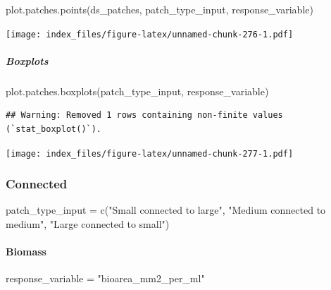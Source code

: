 \documentclass[
]{article}
\newenvironment{Shaded}{\begin{snugshade}}{\end{snugshade}}
\newcommand{\FunctionTok}[1]{\textcolor[rgb]{0.00,0.00,0.00}{#1}}
\newcommand{\NormalTok}[1]{#1}
\newcommand{\OtherTok}[1]{\textcolor[rgb]{0.56,0.35,0.01}{#1}}
\newcommand{\StringTok}[1]{\textcolor[rgb]{0.31,0.60,0.02}{#1}}
\begin{document}
\begin{Shaded}
\begin{Highlighting}[]
\FunctionTok{plot.patches.points}\NormalTok{(ds\_patches, patch\_type\_input,}
\NormalTok{                    response\_variable)}
\end{Highlighting}
\end{Shaded}

\texttt{[image: index\_files/figure-latex/unnamed-chunk-276-1.pdf]}

\hypertarget{boxplots-13}{%
\subparagraph{Boxplots}\label{boxplots-13}}

\begin{Shaded}
\begin{Highlighting}[]
\FunctionTok{plot.patches.boxplots}\NormalTok{(patch\_type\_input,}
\NormalTok{                      response\_variable)}
\end{Highlighting}
\end{Shaded}

\begin{verbatim}
## Warning: Removed 1 rows containing non-finite values (`stat_boxplot()`).
\end{verbatim}

\texttt{[image: index\_files/figure-latex/unnamed-chunk-277-1.pdf]}

\hypertarget{connected}{%
\subsubsection{Connected}\label{connected}}

\begin{Shaded}
\begin{Highlighting}[]
\NormalTok{patch\_type\_input }\OtherTok{=} \FunctionTok{c}\NormalTok{(}\StringTok{"Small connected to large"}\NormalTok{,}
                     \StringTok{"Medium connected to medium"}\NormalTok{,}
                     \StringTok{"Large connected to small"}\NormalTok{)}
\end{Highlighting}
\end{Shaded}

\hypertarget{biomass-3}{%
\paragraph{Biomass}\label{biomass-3}}

\begin{Shaded}
\begin{Highlighting}[]
\NormalTok{response\_variable }\OtherTok{=} \StringTok{"bioarea\_mm2\_per\_ml"}
\end{Highlighting}
\end{Shaded}
\end{document}
